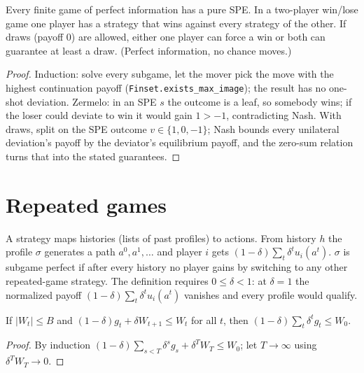 \begin{theorem}
\label{thm:backward-induction}
\leanok
{}
Every finite game of perfect information has a pure SPE. In a two-player win/lose game one player has a strategy
that wins against every strategy of the other. If draws (payoff $0$) are allowed, either one player can force a
win or both can guarantee at least a draw. (Perfect information, no chance moves.)
\end{theorem}
\begin{proof}
\leanok
Induction: solve every subgame, let the mover pick the move with the highest continuation payoff
(\texttt{Finset.exists\_max\_image}); the result has no one-shot deviation. Zermelo: in an SPE $s$ the outcome is a
leaf, so somebody wins; if the loser could deviate to win it would gain $1 > -1$, contradicting Nash. With
draws, split on the SPE outcome $v \in \{1, 0, -1\}$; Nash bounds every unilateral deviation's payoff by the
deviator's equilibrium payoff, and the zero-sum relation turns that into the stated guarantees.
\end{proof}

\section{Repeated games}
\label{sec:repeated}

\begin{definition}
\label{def:repeated}
\leanok
{}
A strategy maps histories (lists of past profiles) to actions. From history $h$ the profile $\sigma$ generates a path
$a^0, a^1, \dots$ and player $i$ gets $(1-\delta)\sum_t \delta^t u_i(a^t)$. $\sigma$ is subgame perfect if after every
history no player gains by switching to any other repeated-game strategy. The definition requires
$0 \le \delta < 1$: at $\delta = 1$ the normalized payoff $(1-\delta)\sum_t \delta^t u_i(a^t)$ vanishes and every profile
would qualify.
\end{definition}

\begin{theorem}
\label{thm:bellman-verification}
\leanok
{}
If $|W_t| \le B$ and $(1-\delta)g_t + \delta W_{t+1} \le W_t$ for all $t$, then $(1-\delta)\sum_t \delta^t g_t \le W_0$.
\end{theorem}
\begin{proof}
\leanok
By induction $(1-\delta)\sum_{s<T}\delta^s g_s + \delta^T W_T \le W_0$; let $T \to \infty$ using $\delta^T W_T \to 0$.
\end{proof}


